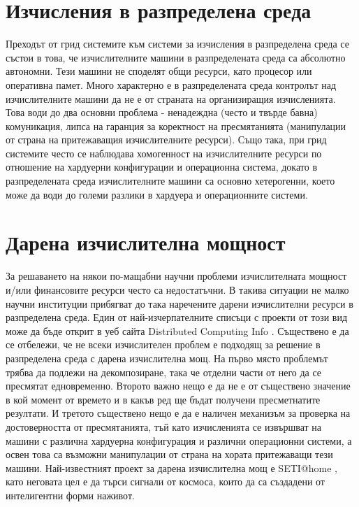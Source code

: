\documentclass[book,14pt,oneside,openany]{memoir}
\begin{document}
\section{Изчисления в разпределена среда}

Преходът от грид системите към системи за изчисления в разпределена среда се състои в това, че изчислителните машини в разпределената среда са абсолютно автономни. Тези машини не споделят общи ресурси, като процесор или оперативна памет. Много характерно е в разпределената среда контролът над изчислителните машини да не е от страната на организиращия изчисленията. Това води до два основни проблема - ненадеждна (често и твърде бавна) комуникация, липса на гаранция за коректност на пресмятанията (манипулации от страна на притежаващия изчислителните ресурси). Също така, при грид системите често се наблюдава хомогенност на изчислителните ресурси по отношение на хардуерни конфигурации и операционна система, докато в разпределената среда изчислителните машини са основно хетерогенни, което може да води до големи разлики в хардуера и операционните системи. 

\section{Дарена изчислителна мощност}

За решаването на някои по-мащабни научни проблеми изчислителната мощност и/или финансовите ресурси често са недостатъчни. В такива ситуации не малко научни институции прибягват до така наречените дарени изчислителни ресурси в разпределена среда. Един от най-изчерпателните списъци с проекти от този вид може да бъде открит в уеб сайта Distributed Computing Info \cite{dcinfo}. Съществено е да се отбележи, че не всеки изчислителен проблем е подходящ за решение в разпределена среда с дарена изчислителна мощ. На първо място проблемът трябва да подлежи на декомпозиране, така че отделни части от него да се пресмятат едновременно. Второто важно нещо е да не е от съществено значение в кой момент от времето и в какъв ред ще бъдат получени пресметнатите резултати. И третото съществено нещо е да е наличен механизъм за проверка на достоверността от пресмятанията, тъй като изчисленията се извършват на машини с различна хардуерна конфигурация и различни операционни системи, а освен това са възможни манипулации от страна на хората притежаващи тези машини. Най-известният проект за дарена изчислителна мощ е SETI@home \cite{shuch}, като неговата цел е да търси сигнали от космоса, които да са създадени от интелигентни форми наживот.
\end{document}
